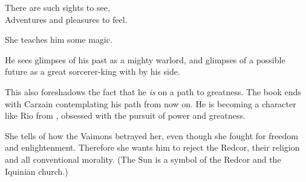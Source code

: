 \begin{garbage}
{  There are such sights to see,\\
  Adventures and pleasures to feel.
}


She teaches him some magic. 


He sees glimpses of his past as a mighty \resphan{} warlord, and glimpses of a possible future as a great sorcerer-king with \Belzir{} by his side. 

This also foreshadows the fact that he \emph{is} on a path to greatness. The book ends with Carzain contemplating his path from now on. He is becoming a character like Rio from \JuukenSentaiGekiranger, obsessed with the pursuit of power and greatness.


She tells of how the  Vaimons betrayed her, even though she fought for freedom and enlightenment. 
Therefore she wants him to reject the Redcor, their religion and all conventional morality. 
(The Sun is a symbol of the Redcor and the Iquinian church.) 







\end{garbage}
